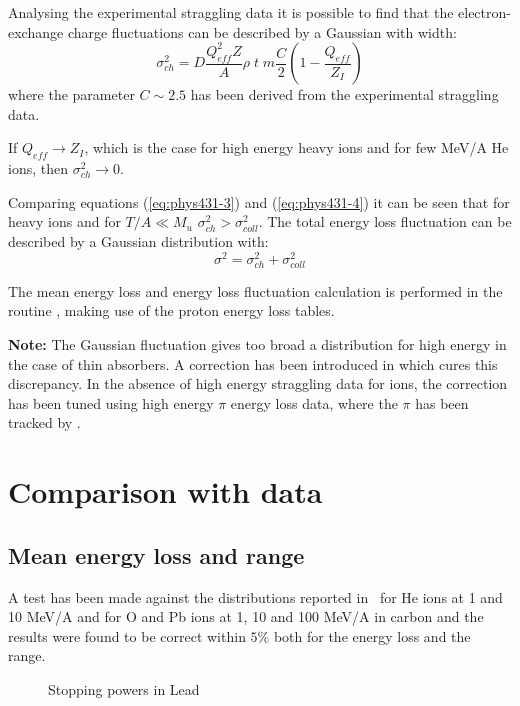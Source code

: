 Analysing the experimental straggling data it is possible to find that
the electron-exchange charge fluctuations can be described by a Gaussian
with width:
\begin{equation}
\label{eq:phys431-4}
\sigma^{2}_{ch} = D \frac{Q_{eff}^{2} Z}{A} \rho \; t \; m \frac{C}{2}
\left ( 1 - \frac{Q_{eff}}{Z_{I}} \right )
\end{equation}
where the parameter $C \sim 2.5$ has been derived
from the experimental straggling data.

If $Q_{eff} \rightarrow Z_{I}$, which is the case for high energy
heavy ions and for few MeV/A He ions, then $\sigma^{2}_{ch} \rightarrow 0$.


Comparing equations (\ref{eq:phys431-3}) and (\ref{eq:phys431-4}) it can be 
seen that for heavy ions and for $T/A \ll M_{u}$ $\sigma^{2}_{ch}
> \sigma^{2}_{coll}$. The total energy loss fluctuation can be
described by a Gaussian distribution with:
\begin{equation}
\sigma^{2} = \sigma^{2}_{ch} + \sigma^{2}_{coll}
\end{equation}

The mean energy loss and energy loss fluctuation calculation is performed
in the routine , making use of the proton energy loss tables.

{\bf Note:} The Gaussian fluctuation gives too broad a distribution for
high energy in the case of thin absorbers. A correction has been introduced
in  which cures this discrepancy. In the absence of high
energy straggling data for ions, the correction has been tuned using 
high energy $\pi$ energy loss data, where the $\pi$ has been tracked
by .

\section{Comparison with data}

\subsection{Mean energy loss and range}

A test has been made against the distributions reported in~\cite{bib-HEIN}
for He ions at 1 and 10 MeV/A and for O and Pb ions at 1, 10 and
100 MeV/A in carbon and the results were found
to be correct within $5\%$ both for the energy loss and the range.

\begin{figure}[hbt]
     \centering
     \caption{Stopping powers in Lead}
     \label{fg:phys431-2}
\end{figure}

